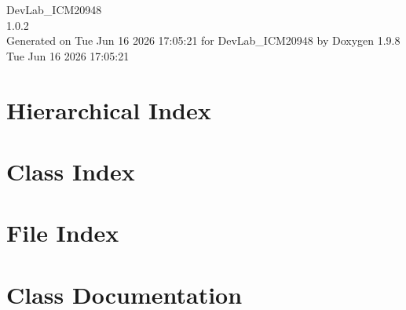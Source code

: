 \documentclass[twoside]{book}
\newcommand{\+}{\discretionary{\mbox{\scriptsize$\hookleftarrow$}}{}{}}
\newcommand{\clearemptydoublepage}{%
    \newpage{\pagestyle{empty}\cleardoublepage}%
  }
\begin{document}
  \raggedbottom
    \hypersetup{pageanchor=false,
                bookmarksnumbered=true,
                pdfencoding=unicode
               }
  \begin{titlepage}
  \vspace*{7cm}
  \begin{center}%
  {\Large Dev\+Lab\+\_\+\+ICM20948}\\
  [1ex]\large 1.\+0.\+2 \\
  \vspace*{1cm}
  {\large Generated on Tue Jun 16 2026 17\+:05\+:21 for Dev\+Lab\+\_\+\+ICM20948 by Doxygen 1.9.8}\\
    \vspace*{0.5cm}
    {\small Tue Jun 16 2026 17:05:21}
  \end{center}
  \end{titlepage}
  \clearemptydoublepage
  \tableofcontents
  \clearemptydoublepage
  \hypersetup{pageanchor=true}

\chapter{Hierarchical Index}

\chapter{Class Index}

\chapter{File Index}

\chapter{Class Documentation}










\end{document}
